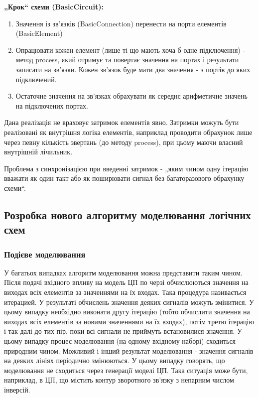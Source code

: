 \documentclass[12pt,a4paper]{article}
\begin{document}
\textbf{„Крок“ схеми (BasicCircuit):}
\begin{enumerate}
  \item Значення із зв’язків (BasicConnection) перенести на порти елементів (BasicElement)
  \item Опрацювати кожен елемент (лише ті що мають хоча б одне підключення) - метод process, який отримує та повертає значення на портах і результати записати на зв’язки. Кожен зв’язок буде мати два значення - з портів до яких підключений.
  \item Остаточне значення на зв’язках обрахувати як середнє арифметичне значень на підключених портах.
\end{enumerate}

Дана реалізація не враховує затримок елементів явно. Затримки можуть бути реалізовані як внутрішня логіка елементів, наприклад проводити обрахунок лише через певну кількість звертань (до методу process), при цьому маючи власний внутрішній лічильник.

Проблема з синхронізацією при введенні затримок - „яким чином одну ітерацію вважати як один такт або як поширювати сигнал без багаторазового обрахунку схеми“.

\subsection{Розробка нового алгоритму моделювання логічних схем}


\subsubsection{Подієве моделювання}

У багатьох випадках алгоритм моделювання можна представити таким чином. Після подачі вхідного впливу на модель ЦП по черзі обчислюються значення на виходах всіх елементів за значеннями на їх входах. Така процедура називається итерацией. У результаті обчислень значення деяких сигналів можуть змінитися. У цьому випадку необхідно виконати другу ітерацію (тобто обчислити значення на виходах всіх елементів за новими значеннями на їх входах), потім третю ітерацію і так далі до тих пір, поки всі сигнали не приймуть встановилися значення. У цьому випадку процес моделювання (на одному вхідному наборі) сходиться природним чином. Можливий і інший результат моделювання - значення сигналів на деяких лініях періодично змінюються. У цьому випадку говорять, що моделювання не сходиться через генерації моделі ЦП. Така ситуація може бути, наприклад, в ЦП, що містить контур зворотного зв'язку з непарним числом інверсій.
\end{document}
